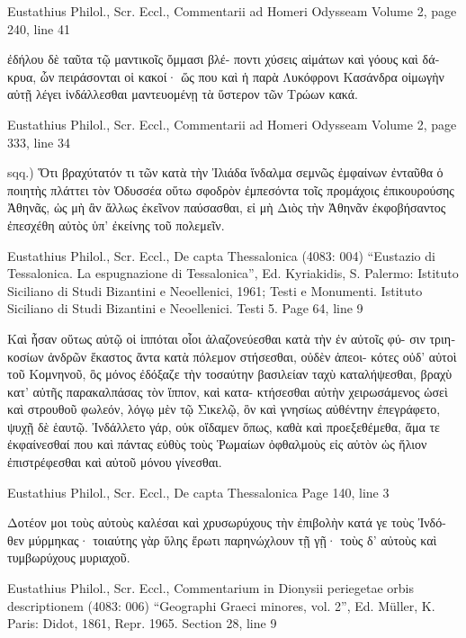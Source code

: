 \documentclass[12pt,letterpaper,twoside,final]{memoir}
\begin{document}
\begin{greek}
Eustathius Philol., Scr. Eccl., Commentarii ad Homeri Odysseam 
Volume 2, page 240, line 41

                                                               ἐδήλου δὲ ταῦτα τῷ μαντικοῖς ὄμμασι βλέ-
ποντι χύσεις αἱμάτων καὶ γόους καὶ δάκρυα, ὧν πειράσονται οἱ κακοί· ὥς που καὶ ἡ παρὰ Λυκόφρονι 
Κασάνδρα οἰμωγὴν αὐτῇ λέγει ἰνδάλλεσθαι μαντευομένῃ τὰ ὕστερον τῶν Τρώων κακά. 



Eustathius Philol., Scr. Eccl., Commentarii ad Homeri Odysseam 
Volume 2, page 333, line 34

                                              sqq.) Ὅτι βραχύτατόν τι τῶν κατὰ τὴν Ἰλιάδα ἴνδαλμα 
σεμνῶς ἐμφαίνων ἐνταῦθα ὁ ποιητὴς πλάττει τὸν Ὀδυσσέα οὕτω σφοδρὸν ἐμπεσόντα τοῖς προμάχοις 
ἐπικουρούσης Ἀθηνᾶς, ὡς μὴ ἂν ἄλλως ἐκεῖνον παύσασθαι, εἰ μὴ Διὸς τὴν Ἀθηνᾶν ἐκφοβήσαντος 
ἐπεσχέθη αὐτὸς ὑπ' ἐκείνης τοῦ πολεμεῖν. 



Eustathius Philol., Scr. Eccl., De capta Thessalonica (4083: 004)
“Eustazio di Tessalonica. La espugnazione di Tessalonica”, Ed. Kyriakidis, S.
Palermo: Istituto Siciliano di Studi Bizantini e Neoellenici, 1961; Testi e Monumenti. Istituto Siciliano di Studi Bizantini e Neoellenici. Testi 5.
Page 64, line 9

Καὶ ἦσαν οὕτως αὐτῷ οἱ ἱππόται οἷοι ἀλαζονεύεσθαι κατὰ τὴν ἐν αὐτοῖς φύ-
σιν τριηκοσίων ἀνδρῶν ἕκαστος ἄντα κατὰ πόλεμον στήσεσθαι, οὐδὲν ἀπεοι-
κότες οὐδ' αὐτοὶ τοῦ Κομνηνοῦ, ὃς μόνος ἐδόξαζε τὴν τοσαύτην βασιλείαν 
ταχὺ καταλήψεσθαι, βραχὺ κατ' αὐτῆς παρακαλπάσας τὸν ἵππον, καὶ κατα-
κτήσεσθαι αὐτὴν χειρωσάμενος ὡσεὶ καὶ στρουθοῦ φωλεόν, λόγῳ μὲν τῷ 
Σικελῷ, ὃν καὶ γνησίως αὐθέντην ἐπεγράφετο, ψυχῇ δὲ ἑαυτῷ. Ἰνδάλλετο 
γάρ, οὐκ οἴδαμεν ὅπως, καθὰ καὶ προεξεθέμεθα, ἅμα τε ἐκφαίνεσθαί που καὶ 
πάντας εὐθὺς τοὺς Ῥωμαίων ὀφθαλμοὺς εἰς αὐτὸν ὡς ἥλιον ἐπιστρέφεσθαι 
καὶ αὐτοῦ μόνου γίνεσθαι. 



Eustathius Philol., Scr. Eccl., De capta Thessalonica 
Page 140, line 3

                                                                           Δοτέον 
μοι τοὺς αὐτοὺς καλέσαι καὶ χρυσωρύχους τὴν ἐπιβολὴν κατά γε τοὺς Ἰνδό-
θεν μύρμηκας· τοιαύτης γὰρ ὕλης ἔρωτι παρηνώχλουν τῇ γῇ· τοὺς δ' αὐτοὺς 
καὶ τυμβωρύχους μυριαχοῦ. 



Eustathius Philol., Scr. Eccl., Commentarium in Dionysii periegetae orbis descriptionem (4083: 006)
“Geographi Graeci minores, vol. 2”, Ed. Müller, K.
Paris: Didot, 1861, Repr. 1965.
Section 28, line 9


\end{greek}
\end{document}
